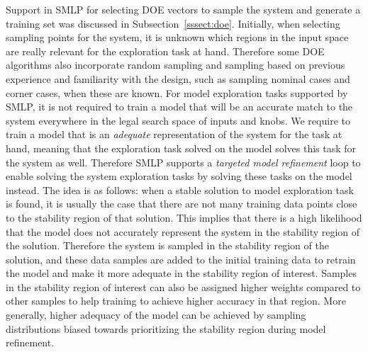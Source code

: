 \documentclass[a4paper,parskip=half]{article} %
\newcommand*\todofb[2][]{\todo[color=cyan!30,tickmarkheight=.2em,size=\scriptsize,#1]{FB: #2}}
\begin{document}
Support in SMLP for selecting DOE vectors to sample the system and generate a training set was discussed in Subsection~\ref{sssect:doe}.
Initially, when selecting sampling points for the system, it is unknown which regions in the input space are really relevant for the exploration task at hand.
Therefore some DOE algorithms also incorporate random sampling and
sampling based on previous experience and familiarity with the design, such as sampling nominal cases and corner cases, when these are known.
For model exploration tasks supported by SMLP, it is not required to train a model that will be an accurate match to the system everywhere in 
the legal search space of inputs and knobs.
We require to train a model that is an \emph{adequate} representation of the system for the task at hand, 
meaning that the exploration task solved on the model solves this task for the system as well.
Therefore SMLP supports a \emph{targeted model refinement} loop to
enable solving the system exploration tasks by solving these tasks on the model instead.
The idea is as follows: when a stable solution to model exploration task is found, it is usually the case that there are not 
many training data points close to the stability region of that solution.
This implies that there is a high likelihood that the model does not accurately represent the system in the stability region of the solution.
Therefore the system is sampled in the stability region of the solution, and these data samples are added to the initial training data to 
retrain the model and make it more adequate in the stability region of interest.
Samples in the stability region of interest can also be assigned higher weights compared to other samples to help training to achieve 
higher accuracy in that region. More generally, higher adequacy of the model can be achieved by sampling distributions biased towards 
prioritizing the stability region during model refinement.
\end{document}
